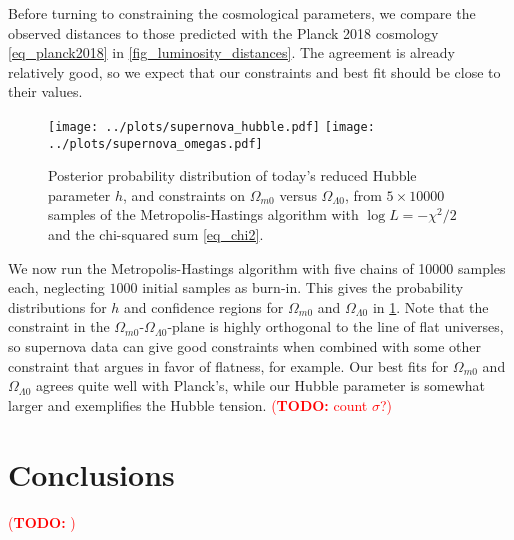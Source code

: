 \documentclass[10pt,a4paper]{article}
\newcommand\TODO[1]{\textcolor{red}{(\textbf{TODO:} #1)}}
\begin{document}
Before turning to constraining the cosmological parameters,
we compare the observed distances to those predicted with the Planck 2018 cosmology \eqref{eq_planck2018} in \cref{fig_luminosity_distances}.
The agreement is already relatively good, so we expect that our constraints and best fit should be close to their values.

\begin{figure}
	\centering
	\texttt{[image: ../plots/supernova\_hubble.pdf]}
	\texttt{[image: ../plots/supernova\_omegas.pdf]}
	\caption{%
		Posterior probability distribution of today's reduced Hubble parameter $h$,
		and constraints on $\Omega_{m0}$ versus $\Omega_{\Lambda0}$,
		from $5 \times 10000$ samples of the Metropolis-Hastings algorithm with $\log L = -\chi^2/2$ and the chi-squared sum \eqref{eq_chi2}.
	}
	\label{fig_supernova_mcmc}
\end{figure}

We now run the Metropolis-Hastings algorithm with five chains of 10000 samples each, neglecting $1000$ initial samples as burn-in.
This gives the probability distributions for $h$ and confidence regions for $\Omega_{m0}$ and $\Omega_{\Lambda0}$ in \cref{fig_supernova_mcmc}.
Note that the constraint in the $\Omega_{m0}$-$\Omega_{\Lambda0}$-plane is highly orthogonal to the line of flat universes,
so supernova data can give good constraints when combined with some other constraint that argues in favor of flatness, for example.
Our best fits for $\Omega_{m0}$ and $\Omega_{\Lambda0}$ agrees quite well with Planck's,
while our Hubble parameter is somewhat larger and exemplifies the Hubble tension.
\TODO{count $\sigma$?}

\section{Conclusions}

\TODO{}

%
\printbibliography
\end{document}
